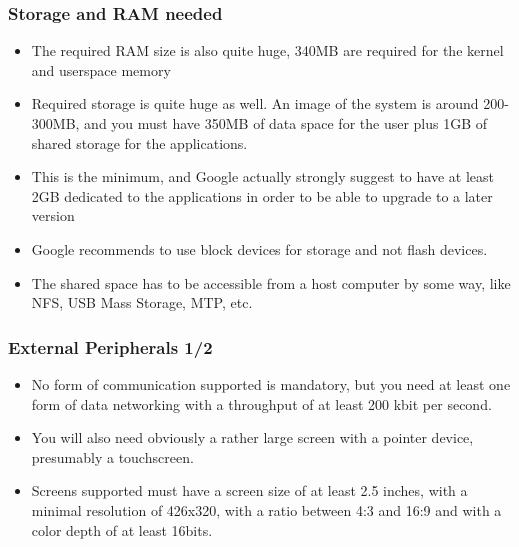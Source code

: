 \begin{frame}
  \frametitle{Storage and RAM needed}
  \begin{itemize}
  \item The required RAM size is also quite huge, 340MB are required
    for the kernel and userspace memory
  \item Required storage is quite huge as well. An image of the system
    is around 200-300MB, and you must have 350MB of data space for the
    user plus 1GB of shared storage for the applications.
  \item This is the minimum, and Google actually strongly suggest to
    have at least 2GB dedicated to the applications in order to be
    able to upgrade to a later version
  \item Google recommends to use block devices for storage and not
    flash devices.
  \item The shared space has to be accessible from a host computer by
    some way, like NFS, USB Mass Storage, MTP, etc.
  \end{itemize}
\end{frame}

\begin{frame}
  \frametitle{External Peripherals 1/2}
  \begin{itemize}
  \item No form of communication supported is mandatory, but you need
    at least one form of data networking with a throughput of at least
    200 kbit per second.
  \item You will also need obviously a rather large screen with a
    pointer device, presumably a touchscreen.
  \item Screens supported must have a screen size of at least 2.5
    inches, with a minimal resolution of 426x320, with a ratio between
    4:3 and 16:9 and with a color depth of at least 16bits.
  \end{itemize}
\end{frame}

